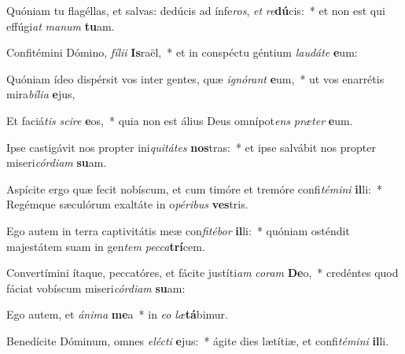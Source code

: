 \item Quóniam tu flagéllas, et salvas: dedúcis ad ínfe\textit{ros}, \textit{et} \textit{re}\textbf{dú}cis:~* et non est qui effúgi\textit{at} \textit{ma}\textit{num} \textbf{tu}am.
\item Confitémini Dómino, \textit{fí}\textit{li}\textit{i} \textbf{Is}raël,~* et in conspéctu géntium \textit{lau}\textit{dá}\textit{te} \textbf{e}um:
\item Quóniam ídeo dispérsit vos inter gentes, quæ \textit{i}\textit{gnó}\textit{rant} \textbf{e}um,~* ut vos enarrétis mira\textit{bí}\textit{li}\textit{a} \textbf{e}jus,
\item Et faciá\textit{tis} \textit{sci}\textit{re} \textbf{e}os,~* quia non est álius Deus omnípot\textit{ens} \textit{præ}\textit{ter} \textbf{e}um.
\item Ipse castigávit nos propter ini\textit{qui}\textit{tá}\textit{tes} \textbf{nos}tras:~* et ipse salvábit nos propter miseri\textit{cór}\textit{di}\textit{am} \textbf{su}am.
\item Aspícite ergo quæ fecit nobíscum, et cum timóre et tremóre confi\textit{té}\textit{mi}\textit{ni} \textbf{il}li:~* Regémque sæculórum exaltáte in o\textit{pé}\textit{ri}\textit{bus} \textbf{ves}tris.
\item Ego autem in terra captivitátis meæ con\textit{fi}\textit{té}\textit{bor} \textbf{il}li:~* quóniam osténdit majestátem suam in gen\textit{tem} \textit{pec}\textit{ca}\textbf{trí}cem.
\item Convertímini ítaque, peccatóres, et fácite justíti\textit{am} \textit{co}\textit{ram} \textbf{De}o,~* credéntes quod fáciat vobíscum miseri\textit{cór}\textit{di}\textit{am} \textbf{su}am:
\item Ego autem, et \textit{á}\textit{ni}\textit{ma} \textbf{me}a~* in \textit{e}\textit{o} \textit{læ}\textbf{tá}bimur.
\item Benedícite Dóminum, omnes \textit{e}\textit{léc}\textit{ti} \textbf{e}jus:~* ágite dies lætítiæ, et confi\textit{té}\textit{mi}\textit{ni} \textbf{il}li.
